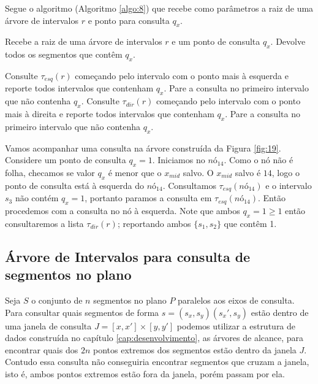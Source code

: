 Segue o algoritmo (Algoritmo \ref{algo:8}) que recebe como parâmetros a raiz de uma árvore de intervalos $r$ e ponto para consulta $q_x$.

\begin{algorithm}[h!]
    \caption{Recebe a raiz de uma árvore de intervalos $r$ e um ponto de consulta $q_x$. Devolve todos os segmentos que contêm $q_x$.}
    \label{algo:8}
    \begin{algorithmic}[1]
                    \State Consulte $\tau_{esq}(r)$ começando pelo intervalo com o ponto mais à esquerda e reporte todos intervalos que contenham $q_x$. Pare a consulta no primeiro intervalo que não contenha $q_x$.
                    \State {}
                \Else
                    \State Consulte $\tau_{dir}(r)$ começando pelo intervalo com o ponto mais à direita e reporte todos intervalos que contenham $q_x$. Pare a consulta no primeiro intervalo que não contenha $q_x$.
                    \State {}
                \EndIf
            \EndIf
        \EndFunction
    \end{algorithmic}
\end{algorithm}

Vamos acompanhar uma consulta na árvore construída da Figura \ref{fig:19}. Considere um ponto de consulta $q_x=1$. Iniciamos no $nó_{14}$. Como o nó não é folha, checamos se valor $q_x$ é menor que o $x_{mid}$ salvo. O $x_{mid}$ salvo é $14$, logo o ponto de consulta está à esquerda do $nó_{14}$. Consultamos $\tau_{esq}(nó_{14})$ e o intervalo $s_3$ não contém $q_x = 1$, portanto paramos a consulta em $\tau_{esq}(nó_{14})$. Então procedemos com a consulta no nó à esquerda. Note que ambos $q_x=1 \geq 1$ então consultaremos a lista $\tau_{dir}(r)$; reportando ambos $\{s_1,s_2\}$ que contêm 1.

\subsection{Árvore de Intervalos para consulta de segmentos no plano}

Seja $S$ o conjunto de $n$ segmentos no plano $P$ paralelos aos eixos de consulta. Para consultar quais segmentos de forma $s=(s_x,s_y)(s_x', s_y)$ estão dentro de uma janela de consulta $J = [x, x'] \times [y, y']$ podemos utilizar a estrutura de dados construída no capítulo \ref{cap:desenvolvimento}, as árvores de alcance, para encontrar quais dos $2n$ pontos extremos dos segmentos estão dentro da janela $J$. Contudo essa consulta não conseguiria encontrar segmentos que cruzam a janela, isto é, ambos pontos extremos estão fora da janela, porém passam por ela.

